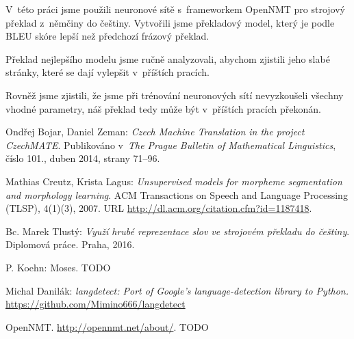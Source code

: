 \documentclass[a4]{article}
\begin{document}
V~této práci jsme použili neuronové sítě s~frameworkem OpenNMT pro strojový
překlad z~němčiny do češtiny. Vytvořili jsme překladový model, který je podle
BLEU skóre lepší než předchozí frázový překlad. 

Překlad nejlepšího modelu jsme ručně analyzovali, abychom zjistili jeho slabé
stránky, které se dají vylepšit v~příštích pracích.

Rovněž jsme zjistili, že jsme při trénování neuronových sítí nevyzkoušeli
všechny vhodné parametry, náš překlad tedy může být v~příštích pracích překonán.

\begin{thebibliography}{99}



 Ondřej Bojar, Daniel Zeman: {\sl Czech Machine Translation in the project
 CzechMATE}. Publikováno v~{\sl The Prague Bulletin of Mathematical
 Linguistics}, číslo 101., duben 2014, strany 71–96.

	Mathias Creutz, Krista Lagus: {\sl Unsupervised models for morpheme
	segmentation and
	morphology learning}. ACM Transactions on Speech and Language Processing
	(TLSP), 4(1)(3),
	2007. URL \url{http://dl.acm.org/citation.cfm?id=1187418}.

 Bc. Marek Tlustý: {\sl  Využí hrubé reprezentace slov ve strojovém
překladu do češtiny}. Diplomová práce. Praha, 2016.

 P. Koehn: Moses. TODO 



 Michal Danilák: {\sl langdetect: Port of Google's language-detection library to
 Python.}
 \url{https://github.com/Mimino666/langdetect}

 OpenNMT. \url{http://opennmt.net/about/}. TODO





\end{thebibliography}
\end{document}

